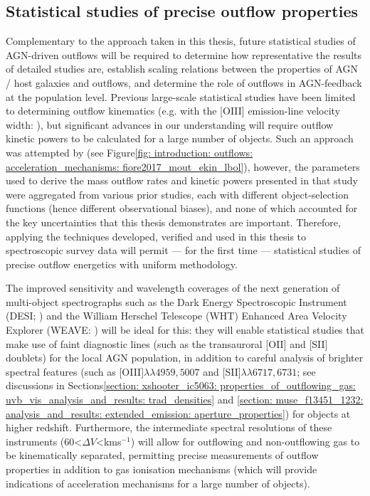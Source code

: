 \subsection{Statistical studies of precise outflow properties}
\label{section: conclusions_and_future_work: future_work: statistical_studies}
\vspace*{-10pt}
Complementary to the approach taken in this thesis, future statistical studies of AGN-driven outflows will be required to determine how representative the results of detailed studies are, establish scaling relations between the properties of AGN / host galaxies and outflows, and determine the role of outflows in AGN-feedback at the population level. Previous large-scale statistical studies have been limited to determining outflow kinematics (e.g. with the [OIII] emission-line velocity width: \citealt{Mullaney2013}), but significant advances in our understanding will require outflow kinetic powers to be calculated for a large number of objects. Such an approach was attempted by \citet{Fiore2017} (see Figure\;\ref{fig: introduction: outflows: acceleration_mechanisms: fiore2017_mout_ekin_lbol}), however, the parameters used to derive the mass outflow rates and kinetic powers presented in that study were aggregated from various prior studies, each with different object-selection functions (hence different observational biases), and none of which accounted for the key uncertainties that this thesis demonstrates are important. Therefore, applying the techniques developed, verified and used in this thesis to spectroscopic survey data will permit --- for the first time --- statistical studies of precise outflow energetics with uniform methodology.

The improved sensitivity and wavelength coverages of the next generation of multi-object spectrographs such as the Dark Energy Spectroscopic Instrument (DESI; \citealt{Levi2019}) and the William Herschel Telescope (WHT) Enhanced Area Velocity Explorer (WEAVE: \citealt{Shoko2023}) will be ideal for this: they will enable statistical studies that make use of faint diagnostic lines (such as the transauroral [OII] and [SII] doublets) for the local AGN population, in addition to careful analysis of brighter spectral features (such as [OIII]$\lambda\lambda4959,5007$ and [SII]$\lambda\lambda6717,6731$; see discussions in Sections\;\ref{section: xshooter_ic5063: properties_of_outflowing_gas: uvb_vis_analysis_and_results: trad_densities} and \ref{section: muse_f13451_1232: analysis_and_results: extended_emission: aperture_properties}) for objects at higher redshift. Furthermore, the intermediate spectral resolutions of these instruments (60\;\textless\;${\Delta}V$\;\textless{}\;km\;s$^{-1}$) will allow for outflowing and non-outflowing gas to be kinematically separated, permitting precise measurements of outflow properties in addition to gas ionisation mechanisms (which will provide indications of acceleration mechanisms for a large number of objects).

